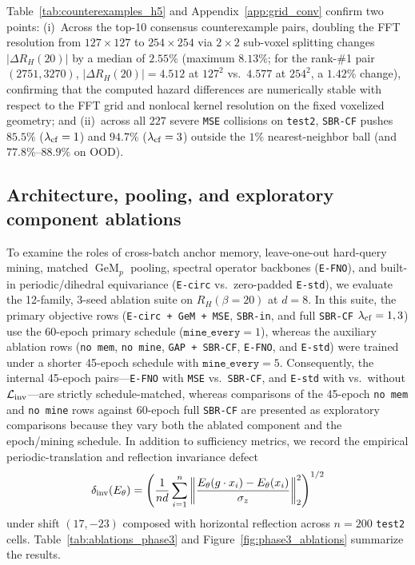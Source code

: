 \documentclass[preprint,11pt,a4paper]{elsarticle}
\newcommand{\norm}[1]{\left\lVert #1\right\rVert}
\newcommand{\GeM}{\operatorname{GeM}}
\begin{document}
Table~\ref{tab:counterexamples_h5} and Appendix~\ref{app:grid_conv} confirm two points:
(i)~Across the top-10 consensus counterexample pairs, doubling the FFT resolution from $127\times 127$ to $254\times 254$ via $2\times 2$ sub-voxel splitting changes $|\Delta R_H(20)|$ by a median of $\mathbf{2.55\%}$ (maximum $8.13\%$; for the rank-\#1 pair $(2751,3270)$, $|\Delta R_H(20)|=4.512$ at $127^2$ vs.\ $4.577$ at $254^2$, a $1.42\%$ change), confirming that the computed hazard differences are numerically stable with respect to the FFT grid and nonlocal kernel resolution on the fixed voxelized geometry; and
(ii)~across all $227$ severe \texttt{MSE} collisions on \texttt{test2}, \texttt{SBR-CF} pushes $\mathbf{85.5\%}$ ($\lambda_{\rm cf}=1$) and $\mathbf{94.7\%}$ ($\lambda_{\rm cf}=3$) outside the $1\%$ nearest-neighbor ball (and $77.8\%\text{--}88.9\%$ on OOD).

\subsection{Architecture, pooling, and exploratory component ablations}
\label{sec:ablations}

To examine the roles of cross-batch anchor memory, leave-one-out hard-query mining, matched $\GeM_p$ pooling, spectral operator backbones (\texttt{E-FNO}), and built-in periodic/dihedral equivariance (\texttt{E-circ} vs.\ zero-padded \texttt{E-std}), we evaluate the 12-family, 3-seed ablation suite on $R_H(\beta=20)$ at $d=8$. In this suite, the primary objective rows (\texttt{E-circ + GeM + MSE}, \texttt{SBR-in}, and full \texttt{SBR-CF} $\lambda_{\rm cf}=1,3$) use the 60-epoch primary schedule ($\texttt{mine\_every}=1$), whereas the auxiliary ablation rows (\texttt{no mem}, \texttt{no mine}, \texttt{GAP + SBR-CF}, \texttt{E-FNO}, and \texttt{E-std}) were trained under a shorter 45-epoch schedule with $\texttt{mine\_every}=5$. Consequently, the internal 45-epoch pairs---\texttt{E-FNO} with \texttt{MSE} vs.\ \texttt{SBR-CF}, and \texttt{E-std} with vs.\ without $\mathcal L_{\rm inv}$---are strictly schedule-matched, whereas comparisons of the 45-epoch \texttt{no mem} and \texttt{no mine} rows against 60-epoch full \texttt{SBR-CF} are presented as exploratory comparisons because they vary both the ablated component and the epoch/mining schedule. In addition to sufficiency metrics, we record the empirical periodic-translation and reflection invariance defect
\begin{equation}
\delta_{\rm inv}(E_\theta)
=
\left(
\frac{1}{nd}\sum_{i=1}^n\norm{\frac{E_\theta(g\cdot x_i)-E_\theta(x_i)}{\sigma_z}}_2^2
\right)^{1/2}
\end{equation}
under shift $(17,-23)$ composed with horizontal reflection across $n=200$ \texttt{test2} cells. Table~\ref{tab:ablations_phase3} and Figure~\ref{fig:phase3_ablations} summarize the results.
\end{document}
